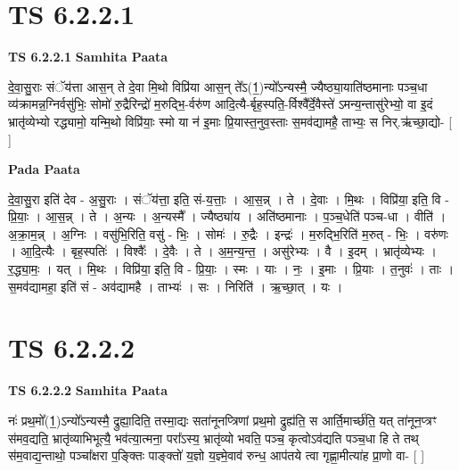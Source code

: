 \documentclass[17pt]{extarticle}
\begin{document}
\section*{ TS 6.2.2.1 }

\textbf{TS 6.2.2.1 } \newline
\textbf{Samhita Paata} \newline

दे॒वा॒सु॒राः संॅय॑त्ता आस॒न् ते दे॒वा मि॒थो विप्रि॑या आस॒न् ते᳚ऽ(1॒)न्यो᳚ऽन्यस्मै॒ ज्यैष्ठ्या॒याति॑ष्ठमानाः पञ्च॒धा व्य॑क्रामन्न॒ग्निर्वसु॑भिः॒ सोमो॑ रु॒द्रैरिन्द्रो॑ म॒रुद्भि॒-र्वरु॑ण आदि॒त्यै-र्बृह॒स्पति॒-र्विश्वै᳚र्दे॒वैस्ते॑ ऽमन्य॒न्तासु॑रेभ्यो॒ वा इ॒दं भ्रातृ॑व्येभ्यो रद्ध्यामो॒ यन्मि॒थो विप्रि॑याः॒ स्मो या न॑ इ॒माः प्रि॒यास्त॒नुव॒स्ताः स॒मव॑द्यामहै॒ ताभ्यः॒ स निर्.ऋ॑च्छा॒द्यो- [  ] \newline

\textbf{Pada Paata} \newline

दे॒वा॒सु॒रा इति॑ देव - अ॒सु॒राः । संॅय॑त्ता॒ इति॒ सं-य॒त्ताः॒ । आ॒स॒न्न् । ते । दे॒वाः । मि॒थः । विप्रि॑या॒ इति॒ वि - प्रि॒याः॒ । आ॒स॒न्न् । ते । अ॒न्यः । अ॒न्यस्मै᳚ । ज्यैष्ठ्या॑य । अति॑ष्ठमानाः । प॒ञ्च॒धेति॑ पञ्च-धा । वीति॑ । अ॒क्रा॒म॒न्न् । अ॒ग्निः । वसु॑भि॒रिति॒ वसु॑ - भिः॒ । सोमः॑ । रु॒द्रैः । इन्द्रः॑ । म॒रुद्भि॒रिति॑ म॒रुत् - भिः॒ । वरु॑णः । आ॒दि॒त्यैः । बृह॒स्पतिः॑ । विश्वैः᳚ । दे॒वैः । ते । अ॒म॒न्य॒न्त॒ । असु॑रेभ्यः । वै । इ॒दम् । भ्रातृ॑व्येभ्यः । र॒द्ध्या॒मः॒ । यत् । मि॒थः । विप्रि॑या॒ इति॒ वि - प्रि॒याः॒ । स्मः । याः । नः॒ । इ॒माः । प्रि॒याः । त॒नुवः॑ । ताः । स॒मव॑द्यामहा॒ इति॑ सं - अव॑द्यामहै । ताभ्यः॑ । सः । निरिति॑ । ऋ॒च्छा॒त् । यः ।  \newline




\section*{ TS 6.2.2.2 }

\textbf{TS 6.2.2.2 } \newline
\textbf{Samhita Paata} \newline

नः॑ प्रथ॒मो᳚(1॒)ऽन्यो᳚ऽन्यस्मै॒ द्रुह्या॒दिति॒ तस्मा॒द्यः सता॑नूनप्त्रिणां प्रथ॒मो द्रुह्य॑ति॒ स आर्ति॒मार्च्छ॑ति॒ यत् ता॑नून॒प्त्रꣳ स॑मव॒द्यति॒ भ्रातृ॑व्याभिभूत्यै॒ भव॑त्या॒त्मना॒ परा᳚ऽस्य॒ भ्रातृ॑व्यो भवति॒ पञ्च॒ कृत्वोऽव॑द्यति पञ्च॒धा हि ते तथ् स॑म॒वाद्य॒न्ताथो॒ पञ्चा᳚क्षरा प॒ङ्क्तिः पाङ्क्तो॑ य॒ज्ञो य॒ज्ञ्मे॒वाव॑ रुन्ध॒ आप॑तये त्वा गृह्णा॒मीत्या॑ह प्रा॒णो वा- [  ] \newline
\end{document}
